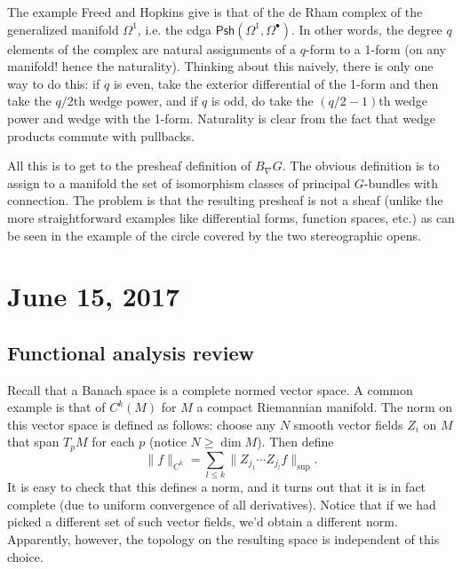 \documentclass{amsart}
\begin{document}
The example Freed and Hopkins give is that of the de Rham complex of the
generalized manifold $\Omega^1$, i.e. the cdga $\textsf{Psh}(\Omega^1, \Omega^\bullet)$.
In other words, the degree $q$ elements of the complex are natural assignments
of a $q$-form to a 1-form (on any manifold! hence the naturality). Thinking
about this naively, there is only one way to do this: if $q$ is even,
take the exterior differential of the 1-form and then take the $q/2$th
wedge power, and if $q$ is odd, do take the $(q/2-1)$th wedge power and
wedge with the 1-form. Naturality is clear from the fact that wedge products
commute with pullbacks.

All this is to get to the presheaf definition of $B_\nabla G$. The obvious
definition is to assign to a manifold the set of isomorphism classes of
principal $G$-bundles with connection. The problem is that the resulting
presheaf is not a sheaf (unlike the more straightforward examples like
differential forms, function spaces, etc.) as can be seen in the example
of the circle covered by the two stereographic opens.

\section{June 15, 2017}

\subsection{Functional analysis review}
Recall that a Banach space is a complete normed vector space. A common
example is that of $C^k(M)$ for $M$ a compact Riemannian manifold. The
norm on this vector space is defined as follows: choose any $N$ smooth
vector fields $Z_i$ on $M$ that span $T_pM$ for each $p$ (notice
$N\geqslant\dim M$). Then define
\begin{equation*}
    \lVert f\rVert_{C^k} = \sum_{l\leqslant k}\lVert Z_{j_1}\cdots Z_{j_l}f\rVert_\text{sup}.
\end{equation*}
It is easy to check that this defines a norm, and it turns out that
it is in fact complete (due to uniform convergence of all derivatives).
Notice that if we had picked a different set of such vector fields,
we'd obtain a different norm. Apparently, however, the topology on the
resulting space is independent of this choice.
\end{document}
